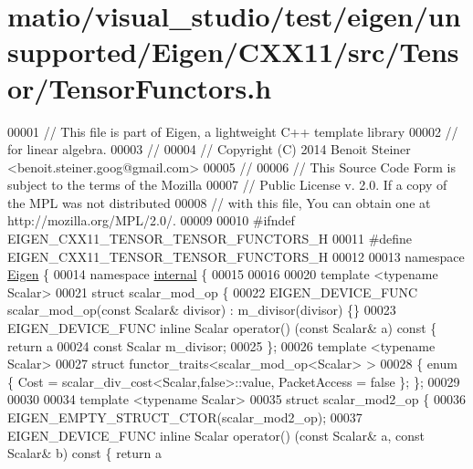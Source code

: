\hypertarget{matio_2visual__studio_2test_2eigen_2unsupported_2_eigen_2_c_x_x11_2src_2_tensor_2_tensor_functors_8h_source}{}\section{matio/visual\+\_\+studio/test/eigen/unsupported/\+Eigen/\+C\+X\+X11/src/\+Tensor/\+Tensor\+Functors.h}
\label{matio_2visual__studio_2test_2eigen_2unsupported_2_eigen_2_c_x_x11_2src_2_tensor_2_tensor_functors_8h_source}

\begin{DoxyCode}
00001 \textcolor{comment}{// This file is part of Eigen, a lightweight C++ template library}
00002 \textcolor{comment}{// for linear algebra.}
00003 \textcolor{comment}{//}
00004 \textcolor{comment}{// Copyright (C) 2014 Benoit Steiner <benoit.steiner.goog@gmail.com>}
00005 \textcolor{comment}{//}
00006 \textcolor{comment}{// This Source Code Form is subject to the terms of the Mozilla}
00007 \textcolor{comment}{// Public License v. 2.0. If a copy of the MPL was not distributed}
00008 \textcolor{comment}{// with this file, You can obtain one at http://mozilla.org/MPL/2.0/.}
00009 
00010 \textcolor{preprocessor}{#ifndef EIGEN\_CXX11\_TENSOR\_TENSOR\_FUNCTORS\_H}
00011 \textcolor{preprocessor}{#define EIGEN\_CXX11\_TENSOR\_TENSOR\_FUNCTORS\_H}
00012 
00013 \textcolor{keyword}{namespace }\hyperlink{namespace_eigen}{Eigen} \{
00014 \textcolor{keyword}{namespace }\hyperlink{namespaceinternal}{internal} \{
00015 
00016 
00020 \textcolor{keyword}{template} <\textcolor{keyword}{typename} Scalar>
00021 \textcolor{keyword}{struct }scalar\_mod\_op \{
00022   EIGEN\_DEVICE\_FUNC scalar\_mod\_op(\textcolor{keyword}{const} Scalar& divisor) : m\_divisor(divisor) \{\}
00023   EIGEN\_DEVICE\_FUNC \textcolor{keyword}{inline} Scalar operator() (\textcolor{keyword}{const} Scalar& a)\textcolor{keyword}{ const }\{ \textcolor{keywordflow}{return} a %
00024   \textcolor{keyword}{const} Scalar m\_divisor;
00025 \};
00026 \textcolor{keyword}{template} <\textcolor{keyword}{typename} Scalar>
00027 \textcolor{keyword}{struct }functor\_traits<scalar\_mod\_op<Scalar> >
00028 \{ \textcolor{keyword}{enum} \{ Cost = scalar\_div\_cost<Scalar,false>::value, PacketAccess = \textcolor{keyword}{false} \}; \};
00029 
00030 
00034 \textcolor{keyword}{template} <\textcolor{keyword}{typename} Scalar>
00035 \textcolor{keyword}{struct }scalar\_mod2\_op \{
00036   EIGEN\_EMPTY\_STRUCT\_CTOR(scalar\_mod2\_op);
00037   EIGEN\_DEVICE\_FUNC \textcolor{keyword}{inline} Scalar operator() (\textcolor{keyword}{const} Scalar& a, \textcolor{keyword}{const} Scalar& b)\textcolor{keyword}{ const }\{ \textcolor{keywordflow}{return} a %

\end{DoxyCode}
